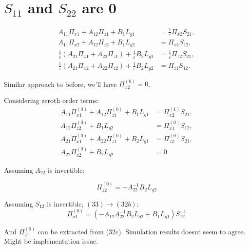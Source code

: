 \documentclass{article}
\begin{document}
\section{$S_{11}$ and $S_{22}$ are 0}

\begin{subequations}
\begin{align}
A_{11}\Pi_{x1}+A_{12}\Pi_{z1}+B_1L_{g1}
  &= \frac{1}{\varepsilon}\Pi_{x2}S_{21}, \\
A_{11}\Pi_{x2}+A_{12}\Pi_{z2}+B_1L_{g2}
  &= \Pi_{x1}S_{12}, \\
\frac{1}{\varepsilon}\!\left(A_{21}\Pi_{x1}+A_{22}\Pi_{z1}\right)+\frac{1}{\varepsilon}B_2L_{g1}
  &= \frac{1}{\varepsilon}\Pi_{z2}S_{21}, \\
\frac{1}{\varepsilon}\!\left(A_{21}\Pi_{x2}+A_{22}\Pi_{z2}\right)+\frac{1}{\varepsilon}B_2L_{g2}
  &= \Pi_{z1}S_{12}.
\end{align}
\end{subequations}

Similar approach to before, we'll have $\Pi_{x2}^{(0)} = 0$. 

Considering zeroth order terms: 
\begin{subequations}
\begin{align}
A_{11}\Pi_{x1}^{(0)}+A_{12}\Pi_{z1}^{(0)}+B_1L_{g1}
  &= \Pi_{x2} ^ {(1)} S_{21}, 
\\
A_{12}\Pi_{z2} ^ {(0)} + B_1 L_{g2}
  &= \Pi_{x1}^{(0)} S_{12}, 
\\
A_{21}\Pi_{x1}^{(0)} + A_{22}\Pi_{z1}^{(0)} + B_2 L_{g1}
  &= \Pi_{z2} ^ {(0)} S_{21}, 
\\
A_{22}\Pi_{z2}^{(0)} + B_2L_{g2}
  &= 0
\end{align}
\end{subequations}

Assuming $A_{22}$ is invertible: 

\begin{equation}
  \Pi_{z2}^{(0)} = - A_{22}^{-1} B_2 L_{g2}
\end{equation}



Assuming $S_{12}$ is invertible, $(33) \to (32b)$:
\begin{equation}
  \Pi_{x1}^{(0)} = (- A_{12} A_{22}^{-1} B_2 L_{g2} + B_1 L_{g1}) S_{12}^{-1}
\end{equation}

And $\Pi_{z1}^{(0)}$ can be extracted from (32c). Simulation results doesnt seem to agree. 
Might be implementation issue. 
\end{document}
